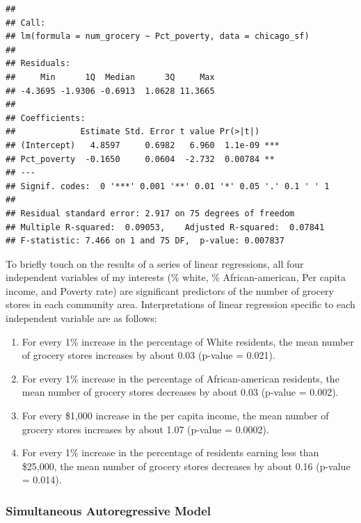 \documentclass[
]{article}
\providecommand{\tightlist}{%
  \setlength{\itemsep}{0pt}\setlength{\parskip}{0pt}}
\begin{document}
\begin{verbatim}
## 
## Call:
## lm(formula = num_grocery ~ Pct_poverty, data = chicago_sf)
## 
## Residuals:
##     Min      1Q  Median      3Q     Max 
## -4.3695 -1.9306 -0.6913  1.0628 11.3665 
## 
## Coefficients:
##             Estimate Std. Error t value Pr(>|t|)    
## (Intercept)   4.8597     0.6982   6.960  1.1e-09 ***
## Pct_poverty  -0.1650     0.0604  -2.732  0.00784 ** 
## ---
## Signif. codes:  0 '***' 0.001 '**' 0.01 '*' 0.05 '.' 0.1 ' ' 1
## 
## Residual standard error: 2.917 on 75 degrees of freedom
## Multiple R-squared:  0.09053,    Adjusted R-squared:  0.07841 
## F-statistic: 7.466 on 1 and 75 DF,  p-value: 0.007837
\end{verbatim}

To briefly touch on the results of a series of linear regressions, all
four independent variables of my interests (\% white, \%
African-american, Per capita income, and Poverty rate) are significant
predictors of the number of grocery stores in each community area.
Interpretations of linear regression specific to each independent
variable are as follows:

\begin{enumerate}
\def\labelenumi{\arabic{enumi}.}
\tightlist
\item
  For every 1\% increase in the percentage of White residents, the mean
  number of grocery stores increases by about 0.03 (p-value = 0.021).\\
\item
  For every 1\% increase in the percentage of African-american
  residents, the mean number of grocery stores decreases by about 0.03
  (p-value = 0.002).\\
\item
  For every \$1,000 increase in the per capita income, the mean number
  of grocery stores increases by about 1.07 (p-value = 0.0002).\\
\item
  For every 1\% increase in the percentage of residents earning less
  than \$25,000, the mean number of grocery stores decreases by about
  0.16 (p-value = 0.014).
\end{enumerate}

\hypertarget{simultaneous-autoregressive-model}{%
\subsubsection{Simultaneous Autoregressive
Model}\label{simultaneous-autoregressive-model}}
\end{document}
